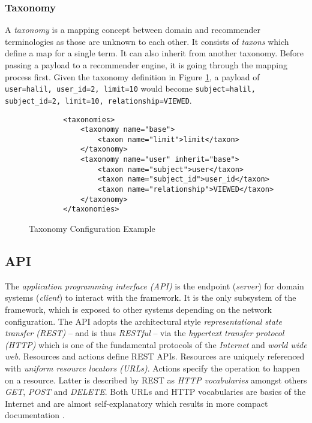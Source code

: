 \subsubsection{Taxonomy}

A \emph{taxonomy} is a mapping concept between domain and recommender terminologies as those are unknown to each other. It consists of \emph{taxons} which define a map for a single term. It can also inherit from another taxonomy. Before passing a payload to a recommender engine, it is going through the mapping process first. Given the taxonomy definition in Figure \ref{fig:architecture-framework-taxonomy}, a payload of \texttt{user=halil, user_id=2, limit=10} would become \texttt{subject=halil, subject_id=2, limit=10, relationship=VIEWED}.

\begin{figure}[ht]
    \begin{verbatim}
        <taxonomies>
            <taxonomy name="base">
                <taxon name="limit">limit</taxon>
            </taxonomy>
            <taxonomy name="user" inherit="base">
                <taxon name="subject">user</taxon>
                <taxon name="subject_id">user_id</taxon>
                <taxon name="relationship">VIEWED</taxon>
            </taxonomy>
        </taxonomies>
    \end{verbatim}
    \caption{Taxonomy Configuration Example}
    \label{fig:architecture-framework-taxonomy}
\end{figure}

\subsection{API}

The \emph{application programming interface (API)} is the endpoint (\emph{server}) for domain systems (\emph{client}) to interact with the framework. It is the only subsystem of the framework, which is exposed to other systems depending on the network configuration. The API adopts the architectural style \emph{representational state transfer (REST)} -- and is thus \emph{RESTful} -- via the \emph{hypertext transfer protocol (HTTP)} which is one of the fundamental protocols of the \emph{Internet} and \emph{world wide web}. Resources and actions define REST APIs. Resources are uniquely referenced with \emph{uniform resource locators (URLs)}. Actions specify the operation to happen on a resource. Latter is described by REST as \emph{HTTP vocabularies} amongst others \emph{GET}, \emph{POST} and \emph{DELETE}. Both URLs and HTTP vocabularies are basics of the Internet and are almost self-explanatory which results in more compact documentation \cite{fielding00}.

